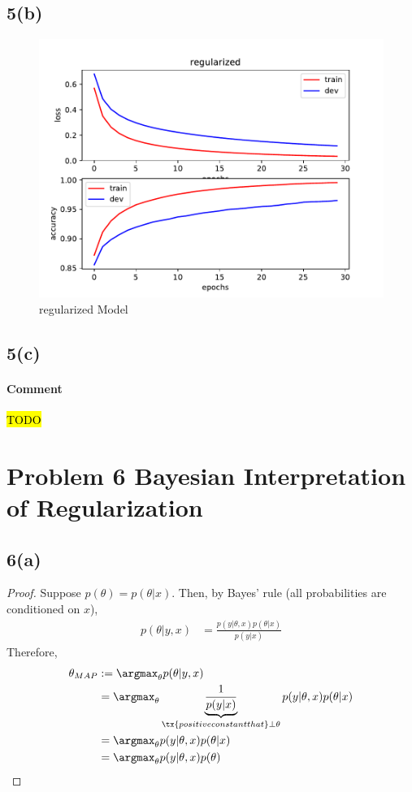 \documentclass[11pt]{article}
\begin{document}
	\subsection{5(b)}
	\begin{figure}[h]
		\centering
		\includegraphics{src/mnist/regularized.pdf}
		\caption{regularized Model}
	\end{figure}
	
	\newpage
	\subsection{5(c)}
	\paragraph{Comment} \hl{TODO}
	
	\newpage
	\section{Problem 6 Bayesian Interpretation of Regularization}
	\subsection{6(a)}
	\begin{proof}
		Suppose $p(\theta) = p(\theta|x)$. Then, by Bayes' rule (all probabilities are conditioned on $x$),
		\begin{align}
			p(\theta|y, x) &= \frac{p(y|\theta, x) p(\theta|x)}{p(y|x)}
		\end{align}
		Therefore,
		\begin{align}
			\theta_{MAP} &:= \argmax_\theta p(\theta|y, x) \\
			&= \argmax_\theta \underbrace{\frac{1}{p(y|x)}}_{\tx{positive constant that } \perp \theta} p(y|\theta, x) p(\theta|x) \\
			&= \argmax_\theta p(y|\theta, x) p(\theta|x) \\
			&= \argmax_\theta p(y|\theta, x) p(\theta)
		\end{align}
	\end{proof}
	
\end{document}
